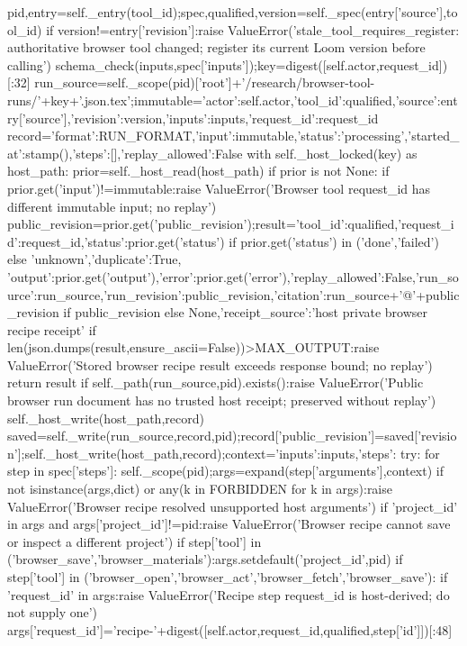   pid,entry=self._entry(tool_id);spec,qualified,version=self._spec(entry['source'],tool_id)
  if version!=entry['revision']:raise ValueError('stale_tool_requires_register: authoritative browser tool changed; register its current Loom version before calling')
  schema_check(inputs,spec['inputs']);key=digest([self.actor,request_id])[:32]
  run_source=self._scope(pid)['root']+'/research/browser-tool-runs/'+key+'.json.tex';immutable={'actor':self.actor,'tool_id':qualified,'source':entry['source'],'revision':version,'inputs':inputs,'request_id':request_id}
  record={'format':RUN_FORMAT,'input':immutable,'status':'processing','started_at':stamp(),'steps':[],'replay_allowed':False}
  with self._host_locked(key) as host_path:
   prior=self._host_read(host_path)
   if prior is not None:
    if prior.get('input')!=immutable:raise ValueError('Browser tool request_id has different immutable input; no replay')
    public_revision=prior.get('public_revision');result={'tool_id':qualified,'request_id':request_id,'status':prior.get('status') if prior.get('status') in ('done','failed') else 'unknown','duplicate':True,
      'output':prior.get('output'),'error':prior.get('error'),'replay_allowed':False,'run_source':run_source,'run_revision':public_revision,'citation':run_source+'@'+public_revision if public_revision else None,'receipt_source':'host private browser recipe receipt'}
    if len(json.dumps(result,ensure_ascii=False))>MAX_OUTPUT:raise ValueError('Stored browser recipe result exceeds response bound; no replay')
    return result
   if self._path(run_source,pid).exists():raise ValueError('Public browser run document has no trusted host receipt; preserved without replay')
   self._host_write(host_path,record)
  saved=self._write(run_source,record,pid);record['public_revision']=saved['revision'];self._host_write(host_path,record);context={'inputs':inputs,'steps':{}}
  try:
   for step in spec['steps']:
    self._scope(pid);args=expand(step['arguments'],context)
    if not isinstance(args,dict) or any(k in FORBIDDEN for k in args):raise ValueError('Browser recipe resolved unsupported host arguments')
    if 'project_id' in args and args['project_id']!=pid:raise ValueError('Browser recipe cannot save or inspect a different project')
    if step['tool'] in ('browser_save','browser_materials'):args.setdefault('project_id',pid)
    if step['tool'] in ('browser_open','browser_act','browser_fetch','browser_save'):
     if 'request_id' in args:raise ValueError('Recipe step request_id is host-derived; do not supply one')
     args['request_id']='recipe-'+digest([self.actor,request_id,qualified,step['id']])[:48]
